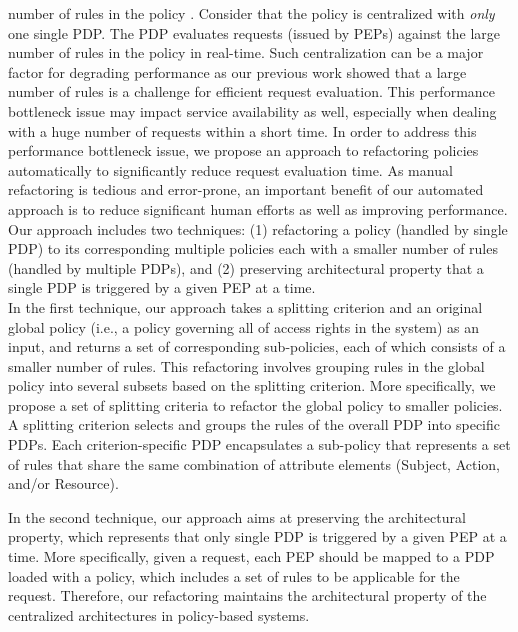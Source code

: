 number of rules in the policy \cite{policymanagement}.
Consider that the policy is centralized with \emph{only} one single PDP.
The PDP evaluates requests (issued by PEPs) against
the large number of rules in the policy in real-time.
Such centralization can be a major factor for degrading performance as our previous work \cite{Xengine} showed that a large number of rules is a challenge for efficient request evaluation.
This performance bottleneck issue may impact service
availability as well, especially when dealing with a huge number of requests within a short time.
In order to address this performance bottleneck issue,
we propose an approach to refactoring policies automatically to significantly reduce
request evaluation time.
As manual refactoring is tedious and error-prone, an important benefit of our automated approach is to reduce significant human efforts as well as
improving performance.
Our approach includes two techniques: (1) refactoring a policy (handled by single PDP) to its corresponding multiple policies each with a smaller number of rules (handled by multiple PDPs),
and (2) preserving architectural property that a single PDP is triggered by a given PEP at a time.\\

In the first technique, our approach takes a splitting criterion and an original global policy (i.e., a policy governing all of access rights in the system) as an input, and returns a set of
corresponding sub-policies, each of which consists of a smaller number of rules.
This refactoring involves grouping rules in the global policy into several subsets based on the splitting criterion.
More specifically, we propose a set of splitting criteria to
refactor the global policy to smaller policies.
A splitting criterion selects and groups the rules of the overall PDP into specific PDPs.
Each criterion-specific PDP encapsulates a sub-policy that represents a set of rules that share the same combination
of attribute elements (Subject, Action, and/or Resource).

In the second technique, our approach aims at preserving the architectural property, which represents that only single PDP is triggered by a given PEP at a time. 
More specifically, given a request, each PEP should be mapped to a PDP loaded with a policy, 
which includes a set of rules to be applicable for the request.
Therefore, our refactoring maintains the architectural property of the centralized architectures in policy-based systems.



